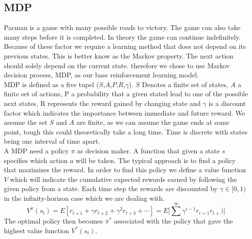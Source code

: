 \documentclass[a4paper]{article}
\begin{document}
\subsection{MDP}
Pacman is a game with many possible roads to victory. The game can also take many steps before it is completed. In theory the game can continue indefinitely. Because of these factor we require a learning method that does not depend on its previous states. This is better know as the Markov property. The next action should solely depend on the current state. therefore we chose to use Markov decision process, MDP, as our base reinforcement learning model. \\
MDP is defined as a five tupel ($S$,$A$,$P$,$R$,$\gamma$). $S$ Denotes a finite set of states, $A$ a finite set of actions, P a probability that a given stated lead to one of the possible next states, R represents the reward gained by changing state and $\gamma$ is a discount factor which indicates the importance between immediate and future reward. We assume the set $S$ and $A$ are finite, as we can assume the game ends at some point, tough this could theoretically take a long time. Time is discrete with states being one interval of time apart.  \\
A MDP need a policy $\pi$ as decision maker. A function that given a state $s$  specifies which action $a$ will be taken. The typical approach is to find a policy that maximizes the reward. In order to find this policy we define a value function $V$ which will indicate the cumulative expected rewards earned by following the given policy from a state. Each time step the rewards are discounted by $\gamma\in [0,1)$ in the infinity-horizon case which we are dealing with. \\
\begin{equation*}
V^{\pi}(s_t)=E[r_{t+1} +\gamma r_{t+2} + \gamma^2 r_{t+3} + \cdots]=E\Big[\sum^{\infty} \gamma^{i-1}r_{i=1}r_{t+})\Big]
\end{equation*}
The optimal policy then becomes $\pi^*$ associated with the policy that gave the highest value function $V^*(s_t)$.\\
\end{document}
